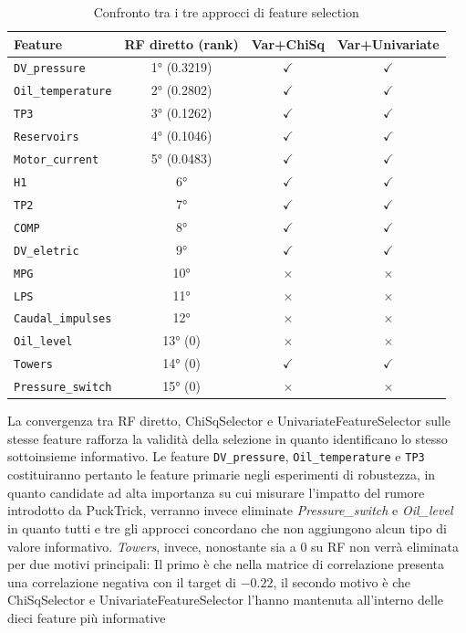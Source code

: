 \documentclass[../main.tex]{subfiles}
\begin{document}
\begin{table}[H]
\centering
\begin{tabular}{|l|c|c|c|}
    \hline
    \textbf{Feature} & \textbf{RF diretto (rank)} & \textbf{Var+ChiSq} & \textbf{Var+Univariate} \\
    
    \hline
    \texttt{DV\_pressure}     & 1° (0.3219) & $\checkmark$ & $\checkmark$ \\
    \texttt{Oil\_temperature} & 2° (0.2802) & $\checkmark$ & $\checkmark$ \\
    \texttt{TP3}              & 3° (0.1262) & $\checkmark$ & $\checkmark$ \\
    \texttt{Reservoirs}       & 4° (0.1046) & $\checkmark$ & $\checkmark$ \\
    \texttt{Motor\_current}   & 5° (0.0483) & $\checkmark$ & $\checkmark$ \\
    \texttt{H1}               & 6° & $\checkmark$ & $\checkmark$ \\
    \texttt{TP2}              & 7° & $\checkmark$ & $\checkmark$ \\
    \texttt{COMP}             & 8° & $\checkmark$ & $\checkmark$ \\
    \texttt{DV\_eletric}      & 9° & $\checkmark$ & $\checkmark$ \\
    \hline
    \texttt{MPG}              & 10° & $\times$ & $\times$ \\
    \texttt{LPS}              & 11° & $\times$ & $\times$ \\
    \texttt{Caudal\_impulses} & 12° & $\times$ & $\times$ \\
    \texttt{Oil\_level}       & 13° (0) & $\times$ & $\times$ \\
    \hline
    \texttt{Towers}           & 14° (0) & $\checkmark$ & $\checkmark$ \\
    \hline
    \texttt{Pressure\_switch} & 15° (0) & $\times$ & $\times$ \\
    \hline
\end{tabular}
\caption{Confronto tra i tre approcci di feature selection}
\label{tab:featureOutput}
\end{table}

La convergenza tra RF diretto, ChiSqSelector e UnivariateFeatureSelector sulle stesse feature rafforza la validità della selezione in quanto identificano lo stesso sottoinsieme informativo. Le feature \texttt{DV\_pressure}, \texttt{Oil\_temperature} e \texttt{TP3} costituiranno pertanto le feature primarie negli esperimenti di robustezza, in quanto candidate ad alta importanza su cui misurare l'impatto del rumore introdotto da PuckTrick, verranno invece eliminate \textit{Pressure\_switch} e \textit{Oil\_level} in quanto tutti e tre gli approcci concordano che non aggiungono alcun tipo di valore informativo. \textit{Towers}, invece, nonostante sia a $0$ su RF non verrà eliminata per due motivi principali: Il primo è che nella matrice di correlazione presenta una correlazione negativa con il target di $-0.22$, il secondo motivo è che ChiSqSelector e UnivariateFeatureSelector l'hanno mantenuta all'interno delle dieci feature più informative
\end{document}
